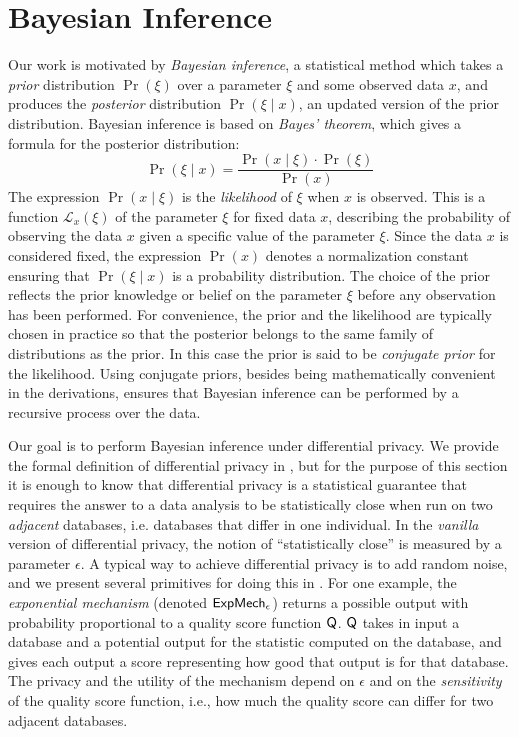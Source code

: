\documentclass{sig-alternate-05-2015}
\theoremstyle{plain}
\theoremstyle{definition}
\theoremstyle{corollary}
\begin{document}
\section{Bayesian Inference}
\label{sec:motivations}

Our work is motivated by \emph{Bayesian inference}, a statistical
method which takes a \emph{prior} distribution $\Pr(\xi)$ over a parameter $\xi$
and some observed data $x$, and produces the \emph{posterior} distribution
$\Pr(\xi \mid x)$, an updated version of the prior distribution. Bayesian
inference is based on \emph{Bayes' theorem}, which gives a formula for the
posterior distribution:
\begin{equation*} \Pr(\xi \mid x)=\frac{\Pr(x \mid \xi)\cdot \Pr(\xi)}{\Pr(x)}
\end{equation*}
The expression $\Pr(x \mid \xi)$ is the \emph{likelihood}
of $\xi$ when $x$ is observed. This is a function $\mathcal{L}_{x}(\xi)$
of the parameter $\xi$ for fixed data $x$, describing the
probability of observing the data $x$ given a specific value of the parameter $\xi$.
Since the data $x$ is considered fixed, the expression $\Pr(x)$
denotes a normalization constant ensuring that $\Pr(\xi \mid x)$ is a
probability distribution. The choice of the prior reflects the prior knowledge
or belief on the parameter $\xi$ before any observation has been
performed. For convenience, the prior and the likelihood are typically chosen in
practice so that the posterior
belongs to the same family of distributions as the prior. In this case
the prior is said to be \emph{conjugate prior} for the likelihood.
Using conjugate priors, besides being mathematically convenient in the
derivations, ensures that Bayesian inference can be performed by a recursive
process over the data. 

Our goal is to perform Bayesian inference under differential
privacy. We provide the formal definition of differential privacy in
, but for the purpose of this section it is enough to know that
differential privacy is a statistical guarantee that requires the answer to a
data analysis to be statistically close when run on two
\emph{adjacent} databases, i.e. databases that differ in one
individual. In the \emph{vanilla} version of differential privacy, the notion of ``statistically close''
is measured by a parameter $\epsilon$. 
A typical way to achieve differential privacy is to add random
noise, and we present several primitives for doing this in
. For one example, the \emph{exponential
mechanism} (denoted $\sf ExpMech_{\epsilon}$) returns a possible
output with
probability proportional to a quality score function ${\sf Q}$.  ${\sf Q}$ takes in input
a database and a potential output for the statistic computed on the database, and
gives each output a
score representing how good that output is for that database.
The privacy and the utility of
the mechanism depend on $\epsilon$ and on the \emph{sensitivity} of
the quality score function,
i.e., how much the quality score can differ for two adjacent databases.
\end{document}
